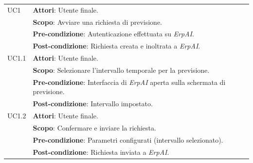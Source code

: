 \tablelasttail{\hline}

{
\centering
{}

\begin{supertabular}{|p{2.75cm}|p{8cm}|}
\hline
    
    UC1 & \textbf{Attori}: Utente finale.\\
        & \textbf{Scopo}: Avviare una richiesta di previsione.\\
        & \textbf{Pre-condizione}: Autenticazione effettuata su \textit{ErpAI}.\\
        & \textbf{Post-condizione}: Richiesta creata e inoltrata a \textit{ErpAI}. \\ \hline
    UC1.1 & \textbf{Attori}: Utente finale.\\
        & \textbf{Scopo}: Selezionare l’intervallo temporale per la previsione.\\
        & \textbf{Pre-condizione}: Interfaccia di \textit{ErpAI} aperta sulla schermata di previsione.\\
        & \textbf{Post-condizione}: Intervallo impostato. \\ \hline
    UC1.2 & \textbf{Attori}: Utente finale.\\
        & \textbf{Scopo}: Confermare e inviare la richiesta.\\
        & \textbf{Pre-condizione}: Parametri configurati (intervallo selezionato).\\
        & \textbf{Post-condizione}: Richiesta inviata a \textit{ErpAI}. \\ \hline


\end{supertabular}}
